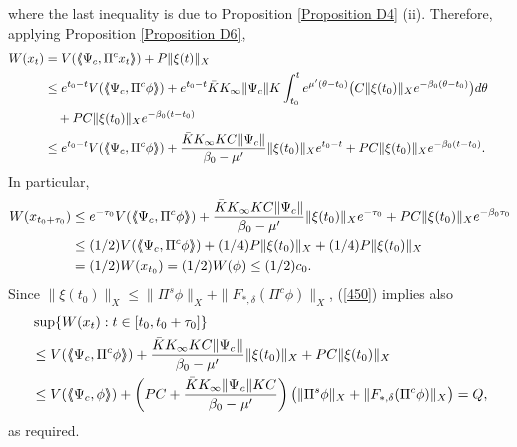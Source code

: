 \documentclass[12pt]{amsart}
\begin{document}
where the last inequality is due to Proposition \ref{Proposition D4} (ii). 
Therefore, applying Proposition \ref{Proposition D6}, 
\begin{align}\label{450}
   W(x_t) 
   &= V({\langle\hspace{-1mm}\langle}\Psi_c, \Pi^c x_t{\rangle\hspace{-1mm}\rangle}) +P\|\xi(t)\|_X \notag \\
   &\leq e^{t_0-t}V({\langle\hspace{-1mm}\langle}\Psi_c, \Pi^c \phi{\rangle\hspace{-1mm}\rangle}) + e^{t_0-t} \bar K K_\infty \|\Psi_c\|
           K\int_{t_0}^t e^{\mu'(\theta-t_0)}\big( C\|\xi(t_0)\|_Xe^{-\beta_0(\theta-t_0)} \big) d\theta  \notag \\
   &\quad +PC\|\xi(t_0)\|_Xe^{-\beta_0(t-t_0)} \notag \\
   &\leq e^{t_0-t}V({\langle\hspace{-1mm}\langle}\Psi_c, \Pi^c \phi{\rangle\hspace{-1mm}\rangle}) 
          + \frac{\bar K K_\infty KC\|\Psi_c\|}{\beta_0-\mu'}\|\xi(t_0)\|_X e^{t_0-t}  
          + PC\|\xi(t_0)\|_Xe^{-\beta_0(t-t_0)}. \qquad 
\end{align}
In particular, 
\begin{align*}
   W(x_{t_0+\tau_0}) 
   &\leq e^{-\tau_0}V({\langle\hspace{-1mm}\langle}\Psi_c, \Pi^c \phi{\rangle\hspace{-1mm}\rangle}) 
         + \frac{\bar K K_\infty KC\|\Psi_c\|}{\beta_0-\mu'}\|\xi(t_0)\|_X 
         e^{-\tau_0}  
         + PC\|\xi(t_0)\|_Xe^{-\beta_0 \tau_0}  \\
   &\leq (1/2) V({\langle\hspace{-1mm}\langle}\Psi_c, \Pi^c \phi{\rangle\hspace{-1mm}\rangle})+ (1/4)P\|\xi(t_0)\|_X+ (1/4)P\|\xi(t_0)\|_X \\
   &= (1/2)W(x_{t_0}) 
    = (1/2)W(\phi) 
    \leq (1/2)c_0. 
\end{align*}
Since $\|\xi(t_0)\|_X\leq \|\Pi^s\phi\|_X+\|F_{\ast,\delta}(\Pi^c\phi)\|_X$, 
(\ref{450}) implies also
\begin{align*}
   &\sup\{ W(x_t): t\in [t_0,t_0+\tau_0]\} \\
   &\leq V({\langle\hspace{-1mm}\langle}\Psi_c, \Pi^c \phi{\rangle\hspace{-1mm}\rangle})  
         + \frac{\bar K K_\infty KC\|\Psi_c\|}{\beta_0-\mu'}\|\xi(t_0)\|_X + PC\|\xi(t_0)\|_X  \\
   &\leq V({\langle\hspace{-1mm}\langle}\Psi_c, \phi{\rangle\hspace{-1mm}\rangle})+\left( PC+\frac{\bar KK_\infty\|\Psi_c\|KC}{\beta_0-\mu'}\right)\big(\|\Pi^s\phi\|_X+\|F_{\ast,\delta}(\Pi^c\phi)\|_X\big) 
   = Q,   
\end{align*}
as required.
\end{document}
